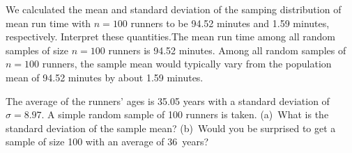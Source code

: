 \begin{examplewrap}
\begin{nexample}{We calculated the mean and standard deviation of the samping distribution of mean run time with $n=100$ runners to be 94.52 minutes and 1.59 minutes, respectively.  Interpret these quantities.}The mean run time among all random samples of size $n=100$ runners is 94.52 minutes.  Among all random samples of $n=100$ runners, the sample mean would typically vary from the population mean of 94.52 minutes by about 1.59 minutes.  
\end{nexample}
\end{examplewrap}

\begin{exercisewrap}
\begin{nexercise}
The average of the runners' ages is 35.05 years with a standard deviation of $\sigma = 8.97$. A simple random sample of 100 runners is taken. (a)~What is the standard deviation of the sample mean? (b)~Would you be surprised to get a sample of size 100 with an average of 36~years?\footnotemark\end{nexercise}
\end{exercisewrap}


